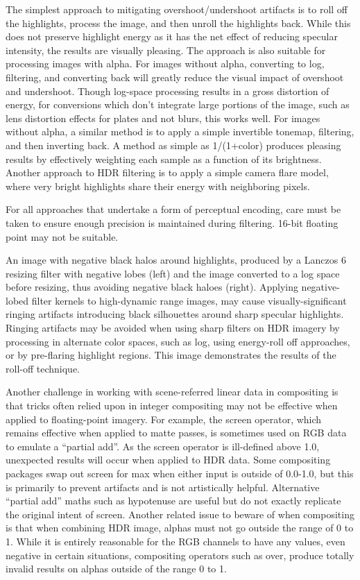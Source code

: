 The simplest approach to mitigating overshoot/undershoot artifacts is to roll off the highlights, process the image, and then unroll the highlights back. While this does not preserve highlight energy as it has the net effect of reducing specular intensity, the results are visually pleasing. The approach is also suitable for processing images with alpha.
For images without alpha, converting to log, filtering, and converting back will greatly reduce the visual impact of overshoot and undershoot. Though log-space processing results in a gross distortion of energy, for conversions which don’t integrate large portions of the image, such as lens distortion effects for plates and not blurs, this works well.
For images without alpha, a similar method is to apply a simple invertible tonemap, filtering, and then inverting back. A method as simple as 1/(1+color) produces pleasing results by effectively weighting each sample as a function of its brightness.
Another approach to HDR filtering is to apply a simple camera flare model, where very bright highlights share their energy with neighboring pixels.

For all approaches that undertake a form of perceptual encoding, care must be taken to ensure enough precision is maintained during filtering. 16-bit floating point may not be suitable.


An image with negative black halos around highlights, produced by a Lanczos 6 resizing filter with negative lobes (left) and the image converted to a log space before resizing, thus avoiding negative black haloes (right).
Applying negative-lobed filter kernels to high-dynamic range images, may cause visually-significant ringing artifacts introducing black silhouettes around sharp specular highlights. Ringing artifacts may be avoided when using sharp filters on HDR imagery by processing in alternate color spaces, such as log, using energy-roll off approaches, or by pre-flaring highlight regions. This image demonstrates the results of the roll-off technique.

Another challenge in working with scene-referred linear data in compositing is that tricks often relied upon in integer compositing may not be effective when applied to floating-point imagery. For example, the screen operator, which remains effective when applied to matte passes, is sometimes used on RGB data to emulate a “partial add”. As the screen operator is ill-defined above 1.0, unexpected results will occur when applied to HDR data. Some compositing packages swap out screen for max when either input is outside of 0.0-1.0, but this is primarily to prevent artifacts and is not artistically helpful.  Alternative “partial add” maths such as hypotenuse are useful but do not exactly replicate the original intent of screen. Another related issue to beware of when compositing is that when combining HDR image, alphas must not go outside the range of 0 to 1. While it is entirely reasonable for the RGB channels to have any values, even negative in certain situations, compositing operators such as over, produce totally invalid results on alphas outside of the range 0 to 1.

